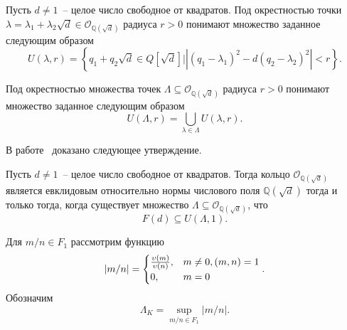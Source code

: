 \documentclass[_00_dissertation.tex]{subfiles}
\begin{document}
\begin{definition}
    Пусть $d \neq 1$~-- целое число свободное от квадратов.
    Под окрестностью точки $\lambda = \lambda_1 + \lambda_2 \sqrt{d} \in \mathcal{O}_{\mathbb{Q}(\sqrt{d})}$ радиуса $r > 0$ понимают множество заданное следующим образом
    \begin{equation*}
        U(\lambda, r) = \left\{
            q_1 + q_2 \sqrt{d} \in Q[\sqrt{d}] \big| |(q_1 - \lambda_1)^2 - d(q_2 - \lambda_2)^2| < r
        \right\}.
    \end{equation*}

    Под окрестностью множества точек $\Lambda \subseteq \mathcal{O}_{\mathbb{Q}(\sqrt{d})}$ радиуса $r > 0$ понимают множество заданное следующим образом
    \begin{equation*}
        U(\Lambda, r) = \bigcup_{\lambda \in \Lambda} U(\lambda, r).
    \end{equation*}
\end{definition}

В работе~\cite[с.~832]{source:Selfridge} доказано следующее утверждение.

\begin{statement}\label{proposition:fundamental_in_circle} \cite[с.~832]{source:Selfridge}
    Пусть $d \neq 1$~-- целое число свободное от квадратов.
    Тогда кольцо $\mathcal{O}_{\mathbb{Q}(\sqrt{d})}$ является евклидовым относительно нормы числового поля $\mathbb{Q}(\sqrt{d})$ тогда и только тогда, когда существует множество $\Lambda \subseteq \mathcal{O}_{\mathbb{Q}(\sqrt{d})}$, что
    \begin{equation*}
        F(d) \subseteq U(\Lambda, 1).
    \end{equation*}
\end{statement}

\begin{definition}\label{definition:euclidean_lambda}
    Для $m/n \in F_1$ рассмотрим функцию
    \begin{equation*}
        |m/n| = \begin{cases}
            \frac{\upsilon(m)}{\upsilon(n)}, & m \neq 0, (m, n) = 1\\
            0, & m = 0
        \end{cases}.
    \end{equation*}
    Обозначим
    \begin{equation*}
        \Lambda_K = \sup_{m/n \in F_1} |m/n|.
    \end{equation*}
\end{definition}
\end{document}
